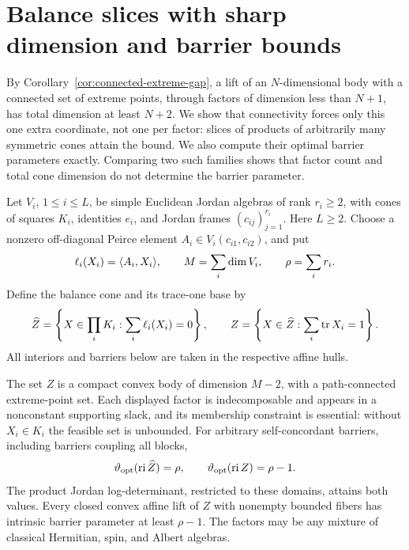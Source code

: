 \section{Balance slices with sharp dimension and barrier bounds}
\label{sec:balance-slices}

By Corollary~\ref{cor:connected-extreme-gap}, a lift of an
$N$-dimensional body with a connected set of extreme points, through
factors of dimension less than $N+1$, has total dimension at least
$N+2$.  We show that connectivity forces only this one extra coordinate,
not one per factor: slices of products of arbitrarily many symmetric
cones attain the bound.  We also compute their optimal barrier
parameters exactly.  Comparing two such families shows that factor count
and total cone dimension do not determine the barrier parameter.

Let $V_i$, $1\leq i\leq L$, be simple Euclidean Jordan algebras of
rank $r_i\geq2$, with cones of squares $K_i$, identities $e_i$, and
Jordan frames $(c_{ij})_{j=1}^{r_i}$.  Here $L\geq2$.
Choose a nonzero off-diagonal Peirce element
$A_i\in V_i(c_{i1},c_{i2})$, and put
\[
 \ell_i(X_i)=\langle A_i,X_i\rangle,\qquad
 M=\sum_i\dim V_i,\qquad \rho=\sum_i r_i.
\]
Define the balance cone and its trace-one base by
\begin{equation}\label{eq:balance-slice}
 \widehat Z=\left\{X\in\prod_iK_i:\sum_i\ell_i(X_i)=0\right\},
 \qquad
 Z=\left\{X\in\widehat Z:\sum_i\operatorname{tr} X_i=1\right\}.
\end{equation}
All interiors and barriers below are taken in the respective affine hulls.

\begin{theorem}\label{thm:balance-slices}
The set $Z$ is a compact convex body of dimension $M-2$, with a
path-connected extreme-point set.  Each displayed factor is
indecomposable and appears in a nonconstant supporting slack, and its
membership constraint is essential: without $X_i\in K_i$ the feasible
set is unbounded.  For arbitrary self-concordant
barriers, including barriers coupling all blocks,
\begin{equation}\label{eq:balance-parameters}
 \vartheta_{\mathrm{opt}}(\operatorname{ri}\widehat Z)=\rho,
 \qquad
 \vartheta_{\mathrm{opt}}(\operatorname{ri} Z)=\rho-1.
\end{equation}
The product Jordan log-determinant, restricted to these domains, attains
both values.  Every closed convex affine lift of $Z$ with nonempty
bounded fibers has intrinsic barrier parameter at least $\rho-1$.
The factors may be any mixture of classical Hermitian, spin, and Albert
algebras.
\end{theorem}

